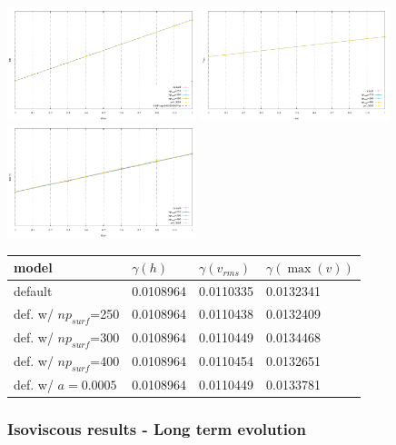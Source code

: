 \begin{center}
\includegraphics[width=5.5cm]{python_codes/fieldstone_95/results/growth_rate}
\includegraphics[width=5.5cm]{python_codes/fieldstone_95/results/growth_rate_vrms}
\includegraphics[width=5.5cm]{python_codes/fieldstone_95/results/growth_rate_maxv}
\end{center}


\begin{center}
\begin{tabular}{llll}
\hline
model    & $\gamma(h)$ & $\gamma(v_{rms})$ & $\gamma(\max(v))$ \\
\hline
\hline
default                 & 0.0108964 & 0.0110335& 0.0132341 \\
def. w/ $np_{surf}$=250 & 0.0108964 & 0.0110438& 0.0132409\\
def. w/ $np_{surf}$=300 & 0.0108964 & 0.0110449& 0.0134468\\
def. w/ $np_{surf}$=400 & 0.0108964 & 0.0110454& 0.0132651\\  
def. w/ $a=0.0005$      & 0.0108964 & 0.0110449& 0.0133781\\
\hline
\end{tabular}
\end{center}

\subsubsection*{Isoviscous results - Long term evolution}

